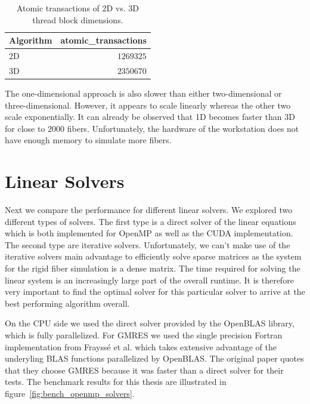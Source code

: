 \documentclass[a4paper,11pt]{kth-mag}
\begin{document}
\begin{table}[!htbp]
  \begin{center}
    \begin{tabulary}{0.7\textwidth}{LR}
      \toprule
      Algorithm & atomic\_transactions \\
      \midrule
      2D & $1269325$ \\
      3D & $2350670$ \\
      \bottomrule
    \end{tabulary}
  \end{center}
  \caption{Atomic transactions of 2D vs. 3D thread block dimensions.}
  \label{tab:atomic_transactions}
\end{table}

The one-dimensional approach is also slower than either two-dimensional or three-dimensional. However, it appears to scale linearly whereas the other two scale exponentially. It can already be observed that 1D becomes faster than 3D for close to $2000$ fibers. Unfortunately, the hardware of the workstation does not have enough memory to simulate more fibers.

\section{Linear Solvers}

Next we compare the performance for different linear solvers. We explored two different types of solvers. The first type is a direct solver of the linear equations which is both implemented for OpenMP as well as the CUDA implementation. The second type are iterative solvers. Unfortunately, we can't make use of the iterative solvers main advantage to efficiently solve sparse matrices as the system for the rigid fiber simulation is a dense matrix. The time required for solving the linear system is an increasingly large part of the overall runtime. It is therefore very important to find the optimal solver for this particular solver to arrive at the best performing algorithm overall.

On the CPU side we used the direct solver provided by the OpenBLAS library, which is fully parallelized. For GMRES we used the single precision Fortran implementation from Frayssé et al. which takes extensive advantage of the underyling BLAS functions parallelized by OpenBLAS. The original paper quotes that they choose GMRES because it was faster than a direct solver for their tests. The benchmark results for this thesis are illustrated in figure~\ref{fig:bench_openmp_solvers}.
\end{document}
